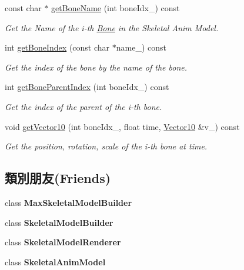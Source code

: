 \begin{DoxyCompactItemize}
\item 
const char $\ast$ \hyperlink{class_magnum_1_1endif_ab08b5b57dc8f5a976d934b61f36790a7}{get\+Bone\+Name} (int bone\+Idx\+\_\+) const 
\begin{DoxyCompactList}\small\item\em Get the Name of the i-\/th \hyperlink{class_magnum_1_1endif_1_1_bone}{Bone} in the Skeletal Anim Model. \end{DoxyCompactList}\item 
int \hyperlink{class_magnum_1_1endif_afc3c06c02c558c18aa11657fb3a84d11}{get\+Bone\+Index} (const char $\ast$name\+\_\+) const 
\begin{DoxyCompactList}\small\item\em Get the index of the bone by the name of the bone. \end{DoxyCompactList}\item 
int \hyperlink{class_magnum_1_1endif_add5b99ac6632ed57dac0b1dded8ef3bb}{get\+Bone\+Parent\+Index} (int bone\+Idx\+\_\+) const 
\begin{DoxyCompactList}\small\item\em Get the index of the parent of the i-\/th bone. \end{DoxyCompactList}\item 
void \hyperlink{class_magnum_1_1endif_a66a295c37fadba864f924f46e2e5ff97}{get\+Vector10} (int bone\+Idx\+\_\+, float time, \hyperlink{class_magnum_1_1_vector10}{Vector10} \&v\+\_\+) const 
\begin{DoxyCompactList}\small\item\em Get the position, rotation, scale of the i-\/th bone at time. \end{DoxyCompactList}\end{DoxyCompactItemize}
\subsection*{類別朋友(Friends)}
\begin{DoxyCompactItemize}
\item 
class {\bfseries Max\+Skeletal\+Model\+Builder}\hypertarget{class_magnum_1_1endif_a01c1ccb3ad3a413e68b2d073aa4a6a20}{}\label{class_magnum_1_1endif_a01c1ccb3ad3a413e68b2d073aa4a6a20}

\item 
class {\bfseries Skeletal\+Model\+Builder}\hypertarget{class_magnum_1_1endif_a68bc87f6949e02b2a7763dcd5b373e17}{}\label{class_magnum_1_1endif_a68bc87f6949e02b2a7763dcd5b373e17}

\item 
class {\bfseries Skeletal\+Model\+Renderer}\hypertarget{class_magnum_1_1endif_a4cc1cb32612548d783030290fc7062bf}{}\label{class_magnum_1_1endif_a4cc1cb32612548d783030290fc7062bf}

\item 
class {\bfseries Skeletal\+Anim\+Model}\hypertarget{class_magnum_1_1endif_a88c72f2f6b125ba518843b71080035e5}{}\label{class_magnum_1_1endif_a88c72f2f6b125ba518843b71080035e5}

\end{DoxyCompactItemize}


